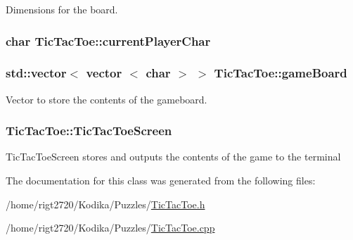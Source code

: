 Dimensions for the board. 

\hypertarget{classTicTacToe_a914627e3dd8100c387e98c4a022b1457}{
\subsubsection[{current\-Player\-Char}]{\setlength{\rightskip}{0pt plus 5cm}char Tic\-Tac\-Toe\-::current\-Player\-Char\hspace{0.3cm}{\ttfamily [private]}}}\label{classTicTacToe_a914627e3dd8100c387e98c4a022b1457}
\hypertarget{classTicTacToe_a56cd1b3760908be79d5fa311c2d17761}{
\subsubsection[{game\-Board}]{\setlength{\rightskip}{0pt plus 5cm}std\-::vector$<$ vector $<$ char $>$ $>$ Tic\-Tac\-Toe\-::game\-Board\hspace{0.3cm}{\ttfamily [private]}}}\label{classTicTacToe_a56cd1b3760908be79d5fa311c2d17761}


Vector to store the contents of the gameboard. 

\hypertarget{classTicTacToe_a6749582a8480be3cbae920f8f2cca8ce}{
\subsubsection[{Tic\-Tac\-Toe\-Screen}]{ Tic\-Tac\-Toe\-::\-Tic\-Tac\-Toe\-Screen\hspace{0.3cm}{\ttfamily [private]}}}\label{classTicTacToe_a6749582a8480be3cbae920f8f2cca8ce}
Tic\-Tac\-Toe\-Screen stores and outputs the contents of the game to the terminal 

The documentation for this class was generated from the following files\-:\begin{DoxyCompactItemize}
\item 
/home/rigt2720/\-Kodika/\-Puzzles/\hyperlink{TicTacToe_8h}{Tic\-Tac\-Toe.\-h}\item 
/home/rigt2720/\-Kodika/\-Puzzles/\hyperlink{TicTacToe_8cpp}{Tic\-Tac\-Toe.\-cpp}\end{DoxyCompactItemize}
